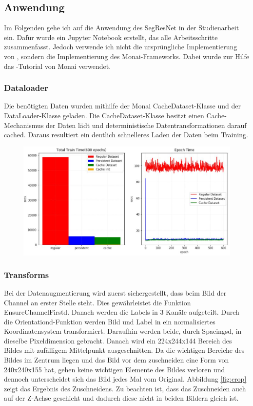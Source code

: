 \subsection{Anwendung}
Im Folgenden gehe ich auf die Anwendung des SegResNet in der Studienarbeit ein. Dafür wurde ein Jupyter Notebook erstellt, das alle Arbeitsschritte zusammenfasst. Jedoch verwende ich nicht die ursprüngliche Implementierung von \cite{Myronenko.2018}, sondern die Implementierung des Monai-Frameworks. Dabei wurde zur Hilfe das -Tutorial von Monai verwendet.

\subsubsection{Dataloader}
Die benötigten Daten wurden mithilfe der Monai CacheDataset-Klasse und der DataLoader-Klasse geladen. Die CacheDataset-Klasse besitzt einen Cache-Mechanismus der Daten lädt und deterministische Datentransformationen darauf cached. Daraus resultiert ein deutlich schnelleres Laden der Daten beim Training. 

\begin{figure}[H]
\includegraphics[width=\linewidth]{./images/cachedataset.jpg}
\label{fig:dataloader}
\end{figure}

\subsubsection{Transforms}
Bei der Datenaugmentierung wird zuerst sichergestellt, dass beim Bild der Channel an erster Stelle steht. Dies gewährleistet die Funktion EnsureChannelFirstd. Danach werden die Labels in 3 Kanäle aufgeteilt. Durch die Orientationd-Funktion werden Bild und Label in ein normalisiertes Koordinatensystem transformiert. Daraufhin werden beide, durch Spacingsd, in dieselbe Pixeldimension gebracht. Danach wird ein 224x244x144 Bereich des Bildes mit zufälligem Mittelpunkt ausgeschnitten. Da die wichtigen Bereiche des Bildes im Zentrum liegen und das Bild vor dem zuschneiden eine Form von 240x240x155 hat, gehen keine wichtigen Elemente des Bildes verloren und dennoch unterscheidet sich das Bild jedes Mal vom Original. Abbildung \ref{fig:crop} zeigt das Ergebnis des Zuschneidens. Zu beachten ist, dass das Zuschneiden auch auf der Z-Achse geschieht und dadurch diese nicht in beiden Bildern gleich ist.

